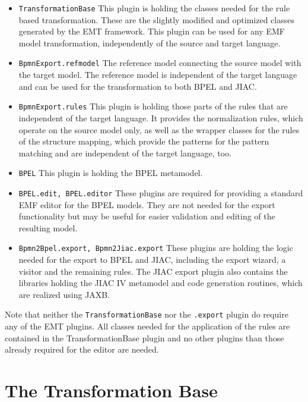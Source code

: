 \begin{itemize}
	\item \texttt{TransformationBase} This plugin is holding the classes needed for the rule based transformation. These are the slightly modified and optimized classes generated by the EMT framework. This plugin can be used for any EMF model transformation, independently of the source and target language.
	\item \texttt{BpmnExport.refmodel} The reference model connecting the source model with the target model. The reference model is independent of the target language and can be used for the transformation to both BPEL and JIAC.
	\item \texttt{BpmnExport.rules} This plugin is holding those parts of the rules that are independent of the target language. It provides the normalization rules, which operate on the source model only, as well as the wrapper classes for the rules of the structure mapping, which provide the patterns for the pattern matching and are independent of the target language, too.
	\item \texttt{BPEL} This plugin is holding the BPEL metamodel.
	\item \texttt{BPEL.edit, BPEL.editor} These plugins are required for providing a standard EMF editor for the BPEL models. They are not needed for the export functionality but may be useful for easier validation and editing of the resulting model.
	\item \texttt{Bpmn2Bpel.export, Bpmn2Jiac.export} These plugins are holding the logic needed for the export to BPEL and JIAC, including the export wizard, a visitor and the remaining rules. The JIAC export plugin also contains the libraries holding the JIAC IV metamodel and code generation routines, which are realized using JAXB.
\end{itemize}

Note that neither the \texttt{TransformationBase} nor the \texttt{.export} plugin do require any of the EMT plugins. All classes needed for the application of the rules are contained in the TransformationBase plugin and no other plugins than those already required for the editor are needed.



\section{The Transformation Base}
\label{sec:impl_emt}

